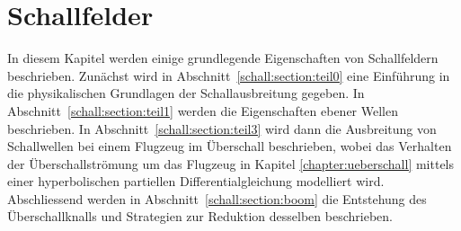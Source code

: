 %
%
%
%
\chapter{Schallfelder\label{chapter:schall}}
\begin{refsection}

\begin{comment}
Ein paar Hinweise für die korrekte Formatierung des Textes
\begin{itemize}
\item
Absätze werden gebildet, indem man eine Leerzeile einfügt.
Die Verwendung von \verb+\\+ ist nur in Tabellen und Arrays gestattet.
\item
Die explizite Platzierung von Bildern ist nicht erlaubt, entsprechende
Optionen werden gelöscht. 
Verwenden Sie Labels und Verweise, um auf Bilder hinzuweisen.
\item
Beginnen Sie jeden Satz auf einer neuen Zeile. 
Damit ermöglichen Sie dem Versionsverwaltungssysteme, Änderungen
in verschiedenen Sätzen von verschiedenen Autoren ohne Konflikt 
anzuwenden.
\item 
Bilden Sie auch für Formeln kurze Zeilen, einerseits der besseren
Übersicht wegen, aber auch um GIT die Arbeit zu erleichtern.
\end{itemize}

\end{comment}

In diesem Kapitel werden einige grundlegende Eigenschaften von
Schallfeldern beschrieben.
Zunächst wird in Abschnitt~\ref{schall:section:teil0} eine Einführung
in die physikalischen Grundlagen der Schallausbreitung gegeben.
In Abschnitt~\ref{schall:section:teil1} werden die Eigenschaften
ebener Wellen beschrieben.
In Abschnitt~\ref{schall:section:teil3} wird dann die Ausbreitung
von Schallwellen bei einem Flugzeug im Überschall beschrieben,
wobei das Verhalten der Überschallströmung um das Flugzeug in Kapitel
\ref{chapter:ueberschall} mittels einer hyperbolischen
partiellen Differentialgleichung modelliert wird.
Abschliessend werden in Abschnitt~\ref{schall:section:boom} die
Entstehung des Überschallknalls und Strategien zur Reduktion desselben
beschrieben.



% 



\printbibliography[heading=subbibliography]
\end{refsection}
